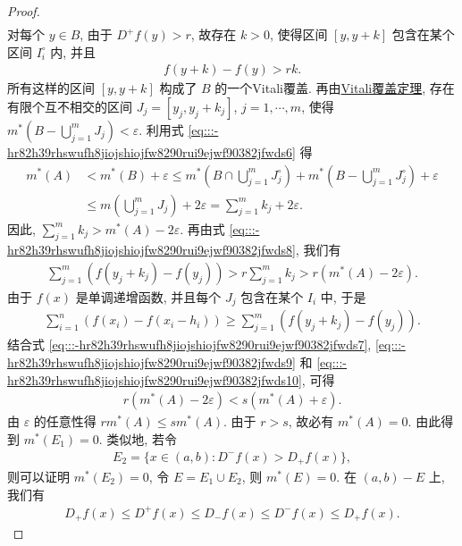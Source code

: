\documentclass[../../main.tex]{subfiles}%
\begin{document}
\begin{proof}
\begin{align}
\end{align}
对每个 $y\in B$, 由于 $D^+f(y) > r$, 故存在 $k>0$, 使得区间 $[y,y+k]$ 包含在某个区间 $I_i^\circ$ 内, 并且
\begin{align}
f(y+k)-f(y) > rk.\label{eq:::-hr82h39rhswufh8jiojshiojfw8290rui9ejwf90382jfwds8}
\end{align}
所有这样的区间 $[y,y+k]$ 构成了 $B$ 的一个Vitali覆盖. 再由\hyperref[theorem:Vitali覆盖定理--实变函数]{Vitali覆盖定理}, 存在有限个互不相交的区间 $J_j = [y_j,y_j+k_j]$, $j=1,\cdots,m$, 使得 $m^*(B-\bigcup_{j=1}^m J_j) < \varepsilon$. 利用式 \eqref{eq:::-hr82h39rhswufh8jiojshiojfw8290rui9ejwf90382jfwds6} 得
\begin{align*}
m^*(A)&<m^*(B)+\varepsilon \leqslant m^*\!\left( B\cap \bigcup_{j=1}^m{J_{j}^{\circ}} \right) +m^*\!\left( B-\bigcup_{j=1}^m{J_{j}^{\circ}} \right) +\varepsilon 
\\
&\leqslant m\!\left( \bigcup_{j=1}^m{J_j} \right) +2\varepsilon =\sum_{j=1}^m{k_j}+2\varepsilon .
\end{align*}
因此, $\sum_{j=1}^m k_j > m^*(A)-2\varepsilon$. 再由式 \eqref{eq:::-hr82h39rhswufh8jiojshiojfw8290rui9ejwf90382jfwds8}, 我们有
\begin{align}
\sum_{j=1}^m (f(y_j+k_j)-f(y_j)) > r\sum_{j=1}^m k_j > r(m^*(A)-2\varepsilon).\label{eq:::-hr82h39rhswufh8jiojshiojfw8290rui9ejwf90382jfwds9}
\end{align}
由于 $f(x)$ 是单调递增函数, 并且每个 $J_j$ 包含在某个 $I_i$ 中, 于是
\begin{align}
\sum_{i=1}^n (f(x_i)-f(x_i-h_i)) \geqslant \sum_{j=1}^m (f(y_j+k_j)-f(y_j)).\label{eq:::-hr82h39rhswufh8jiojshiojfw8290rui9ejwf90382jfwds10}
\end{align}
结合式 \eqref{eq:::-hr82h39rhswufh8jiojshiojfw8290rui9ejwf90382jfwds7}, \eqref{eq:::-hr82h39rhswufh8jiojshiojfw8290rui9ejwf90382jfwds9} 和 \eqref{eq:::-hr82h39rhswufh8jiojshiojfw8290rui9ejwf90382jfwds10}, 可得
\begin{align*}
r(m^*(A)-2\varepsilon) < s(m^*(A)+\varepsilon).
\end{align*}
由 $\varepsilon$ 的任意性得 $rm^*(A)\leqslant sm^*(A)$. 由于 $r>s$, 故必有 $m^*(A)=0$. 由此得到 $m^*(E_1)=0$. 类似地, 若令
\begin{align*}
E_2 = \{x\in(a,b): D^-f(x) > D_+f(x)\},
\end{align*}
则可以证明 $m^*(E_2)=0$, 令 $E=E_1\cup E_2$, 则 $m^*(E)=0$. 在 $(a,b)-E$ 上, 我们有
\begin{align*}
D_+f(x)\leqslant D^+f(x)\leqslant D_-f(x)\leqslant D^-f(x)\leqslant D_+f(x).

\end{align*}
\end{proof}
\end{document}
